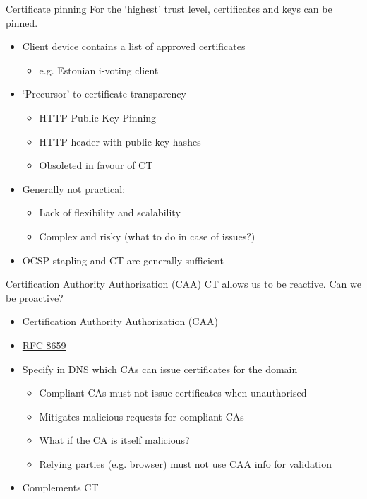 \begin{frame}{Certificate pinning}
  For the `highest' trust level, certificates and keys can be pinned.
  \begin{itemize}[<+(1)->]
    \item Client device contains a list of approved certificates
    \begin{itemize}
      \item e.g. Estonian i-voting client
    \end{itemize}
    \item `Precursor' to certificate transparency
    \begin{itemize}
      \item HTTP Public Key Pinning
      \item HTTP header with public key hashes
      \item Obsoleted in favour of CT
    \end{itemize}
    \item Generally not practical:
    \begin{itemize}
      \item Lack of flexibility and scalability
      \item Complex and risky (what to do in case of issues?)
    \end{itemize}
    \item OCSP stapling and CT are generally sufficient
  \end{itemize}
\end{frame}

\begin{frame}{Certification Authority Authorization (CAA)}
  CT allows us to be reactive.
  Can we be proactive?
  \begin{itemize}
    \item Certification Authority Authorization (CAA)
    \item \href{https://datatracker.ietf.org/doc/html/rfc8659}{RFC 8659}
    \item Specify in DNS which CAs can issue certificates for the domain
    \begin{itemize}
      \item Compliant CAs must not issue certificates when unauthorised
      \item Mitigates malicious requests for compliant CAs
      \item What if the CA is itself malicious?
      \item Relying parties (e.g. browser) must not use CAA info for validation
    \end{itemize}
    \item Complements CT
  \end{itemize}
\end{frame}

